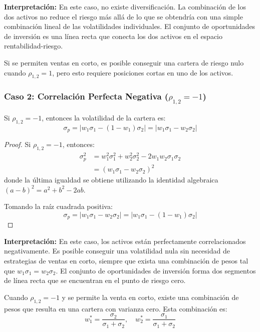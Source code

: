 \textbf{Interpretación:} En este caso, no existe diversificación. La combinación de los dos activos no reduce el riesgo más allá de lo que se obtendría con una simple combinación lineal de las volatilidades individuales. El conjunto de oportunidades de inversión es una línea recta que conecta los dos activos en el espacio rentabilidad-riesgo.

Si se permiten ventas en corto, es posible conseguir una cartera de riesgo nulo cuando $\rho_{1,2} = 1$, pero esto requiere posiciones cortas en uno de los activos.

\subsubsection{Caso 2: Correlación Perfecta Negativa ($\rho_{1,2} = -1$)}

\begin{proposicion}
Si $\rho_{1,2} = -1$, entonces la volatilidad de la cartera es:
\begin{equation}
\sigma_p = |w_1 \sigma_1 - (1 - w_1) \sigma_2| = |w_1 \sigma_1 - w_2 \sigma_2|
\end{equation}
\end{proposicion}

\begin{proof}
Si $\rho_{1,2} = -1$, entonces:
\begin{align*}
\sigma_p^2 &= w_1^2 \sigma_1^2 + w_2^2 \sigma_2^2 - 2w_1 w_2 \sigma_1 \sigma_2 \\
&= (w_1 \sigma_1 - w_2 \sigma_2)^2
\end{align*}
donde la última igualdad se obtiene utilizando la identidad algebraica $(a - b)^2 = a^2 + b^2 - 2ab$.

Tomando la raíz cuadrada positiva:
$$\sigma_p = |w_1 \sigma_1 - w_2 \sigma_2| = |w_1 \sigma_1 - (1 - w_1) \sigma_2|$$
\end{proof}

\textbf{Interpretación:} En este caso, los activos están perfectamente correlacionados negativamente. Es posible conseguir una volatilidad nula sin necesidad de estrategias de ventas en corto, siempre que exista una combinación de pesos tal que $w_1 \sigma_1 = w_2 \sigma_2$. El conjunto de oportunidades de inversión forma dos segmentos de línea recta que se encuentran en el punto de riesgo cero.

\begin{proposicion}
Cuando $\rho_{1,2} = -1$ y se permite la venta en corto, existe una combinación de pesos que resulta en una cartera con varianza cero. Esta combinación es:
\begin{equation}
w_1^* = \frac{\sigma_2}{\sigma_1 + \sigma_2}, \quad w_2^* = \frac{\sigma_1}{\sigma_1 + \sigma_2}
\end{equation}
\end{proposicion}

